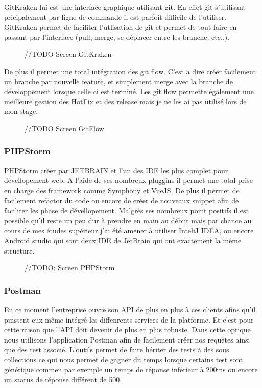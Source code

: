 GitKraken lui est une interface graphique utilisant git. En effet git s'utilisant pricipalement par ligne de commande il est parfoit difficile de l'utiliser. GitKraken permet de faciliter l'utlisation de git et permet de tout faire en passant par l'interface (pull, merge, se déplacer entre les branche, etc..).

\begin{figure}[htbp]
    \center
    //TODO Screen GitKraken
\end{figure}

De plus il permet une total intégration des git flow. C'est a dire créer facilement un branche par nouvelle feature, et simplement merge avec la branche de développement lorsque celle ci est terminé.
Les git flow permette également une meilleure gestion des HotFix et des release mais je ne les ai pas utilisé lors de mon stage. 

\begin{figure}[htbp]
    \center
    //TODO Screen GitFlow
\end{figure}


\subsubsection{PHPStorm}

PHPStorm créer par JETBRAIN et l'un des IDE les plus complet pour dévellopement web.
A l'aide de ses nombreux pluggins il permet une total prise en charge des framework comme Symphony et VueJS. De plus il permet de facilement refactor du code  ou encore de créer de nouveaux snippet afin de faciliter les phase de dévellopement.
Malgrès ses nombreux point positifs il est possible qu'il reste un peu dur à prendre en main au début mais par chance au cours de mes études supérieur j'ai été amener à utiliser InteliJ IDEA, ou encore Android studio qui sont deux IDE de JetBrain qui ont exactement la méme structure. 

\begin{figure}[htbp]
    \center 
    //TODO: Screen PHPStorm
\end{figure}


\subsubsection{Postman}

En ce moment l'entreprise ouvre son API de plus en plus à ces clients afins qu'il puissent eux même intégré les diffenrents services de la platforme. Et c'est pour cette raison que l'API doit devenir de plus en plus robuste. Dans cette optique nous utilisons l'application Postman afin de facilement créer nos requêtes ainsi que des test associé. L'outils permet de faire hériter des tests à des sous collections ce qui nous permet de gagner du temps lorsque certains test sont générique commen par exemple un temps de réponse inférieur à 200ms ou encore un status de réponse différent de 500. 

